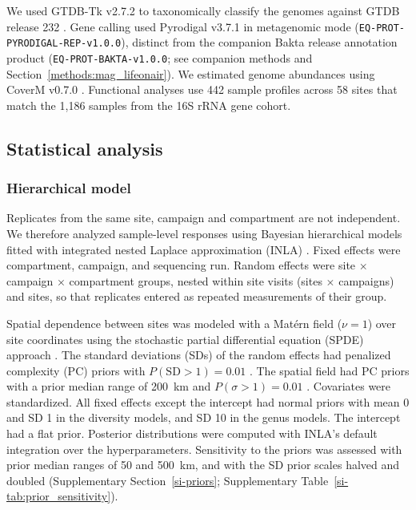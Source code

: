 \documentclass[fleqn,10pt,numbers]{olplainarticle}
\begin{document}
We used GTDB-Tk v2.7.2 \cite{chaumeil2022gtdbtk} to taxonomically classify the genomes against GTDB release 232 \cite{parks2022gtdb}. Gene calling used Pyrodigal v3.7.1 in metagenomic mode (\texttt{EQ-PROT-PYRODIGAL-REP-v1.0.0}), distinct from the companion Bakta release annotation product (\texttt{EQ-PROT-BAKTA-v1.0.0}; see companion methods \cite{rubalkhali_datapaper} and Section~\ref{methods:mag_lifeonair}). We estimated genome abundances using CoverM v0.7.0 \cite{aroney2025coverm}. Functional analyses use 442 sample profiles across 58 sites that match the 1,186 samples from the 16S rRNA gene cohort.



\subsection*{Statistical analysis}
\subsubsection*{Hierarchical model}
Replicates from the same site, campaign and compartment are not independent. We therefore analyzed sample-level responses using Bayesian hierarchical models fitted with integrated nested Laplace approximation (INLA) \cite{rue2009}. Fixed effects were compartment, campaign, and sequencing run. Random effects were site $\times$ campaign $\times$ compartment groups, nested within site visits (sites $\times$ campaigns) and sites, so that replicates entered as repeated measurements of their group.

Spatial dependence between sites was modeled with a Matérn field ($\nu = 1$) over site coordinates using the stochastic partial differential equation (SPDE) approach \cite{lindgren2011}. The standard deviations (SDs) of the random effects had penalized complexity (PC) priors with $P(\mathrm{SD} > 1) = 0.01$ \cite{simpson2017penalising}. The spatial field had PC priors with a prior median range of 200~km and $P(\sigma > 1) = 0.01$ \cite{fuglstad2019constructing}. Covariates were standardized. All fixed effects except the intercept had normal priors with mean 0 and SD 1 in the diversity models, and SD 10 in the genus models. The intercept had a flat prior. Posterior distributions were computed with INLA's default integration over the hyperparameters. Sensitivity to the priors was assessed with prior median ranges of 50 and 500~km, and with the SD prior scales halved and doubled (Supplementary Section~\ref{si-priors}; Supplementary Table~\ref{si-tab:prior_sensitivity}).
\end{document}
